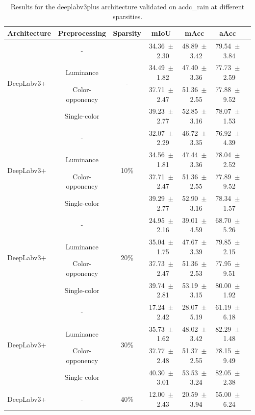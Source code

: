 \begin{table}[h]
\centering
\caption{Results for the deeplabv3plus architecture validated on acdc_rain at different sparsities.}
\begin{tabular}{@{}lccc ccc@{}}
\toprule
Architecture & Preprocessing & Sparsity & mIoU & mAcc & aAcc \\
\midrule

\multirow{4}{*}{DeepLabv3+} & - & \multirow{4}{*}{-} & 34.36~$\pm$~2.30 & 48.89~$\pm$~3.42 & 79.54~$\pm$~3.84 \\
& Luminance & & 34.49~$\pm$~1.82 & 47.40~$\pm$~3.36 & 77.73~$\pm$~2.59 \\
& Color-opponency & & 37.71~$\pm$~2.47 & 51.36~$\pm$~2.55 & 77.88~$\pm$~9.52 \\
& Single-color & & 39.23~$\pm$~2.77 & 52.85~$\pm$~3.16 & 78.07~$\pm$~1.53 \\
\midrule
\multirow{4}{*}{DeepLabv3+} & - & \multirow{4}{*}{10\%} & 32.07~$\pm$~2.29 & 46.72~$\pm$~3.35 & 76.92~$\pm$~4.39 \\
& Luminance & & 34.56~$\pm$~1.81 & 47.44~$\pm$~3.36 & 78.04~$\pm$~2.52 \\
& Color-opponency & & 37.71~$\pm$~2.47 & 51.36~$\pm$~2.55 & 77.89~$\pm$~9.52 \\
& Single-color & & 39.29~$\pm$~2.77 & 52.90~$\pm$~3.16 & 78.34~$\pm$~1.57 \\
\midrule
\multirow{4}{*}{DeepLabv3+} & - & \multirow{4}{*}{20\%} & 24.95~$\pm$~2.16 & 39.01~$\pm$~4.59 & 68.70~$\pm$~5.26 \\
& Luminance & & 35.04~$\pm$~1.75 & 47.67~$\pm$~3.39 & 79.85~$\pm$~2.15 \\
& Color-opponency & & 37.73~$\pm$~2.47 & 51.36~$\pm$~2.53 & 77.95~$\pm$~9.51 \\
& Single-color & & 39.74~$\pm$~2.81 & 53.19~$\pm$~3.15 & 80.00~$\pm$~1.92 \\
\midrule
\multirow{4}{*}{DeepLabv3+} & - & \multirow{4}{*}{30\%} & 17.24~$\pm$~2.42 & 28.07~$\pm$~5.19 & 61.19~$\pm$~6.18 \\
& Luminance & & 35.73~$\pm$~1.62 & 48.02~$\pm$~3.42 & 82.29~$\pm$~1.48 \\
& Color-opponency & & 37.77~$\pm$~2.48 & 51.37~$\pm$~2.55 & 78.15~$\pm$~9.49 \\
& Single-color & & 40.30~$\pm$~3.01 & 53.53~$\pm$~3.24 & 82.05~$\pm$~2.38 \\
\midrule
\multirow{4}{*}{DeepLabv3+} & - & \multirow{4}{*}{40\%} & 12.00~$\pm$~2.43 & 20.59~$\pm$~3.94 & 55.00~$\pm$~6.24 \\

\end{tabular}
\end{table}
